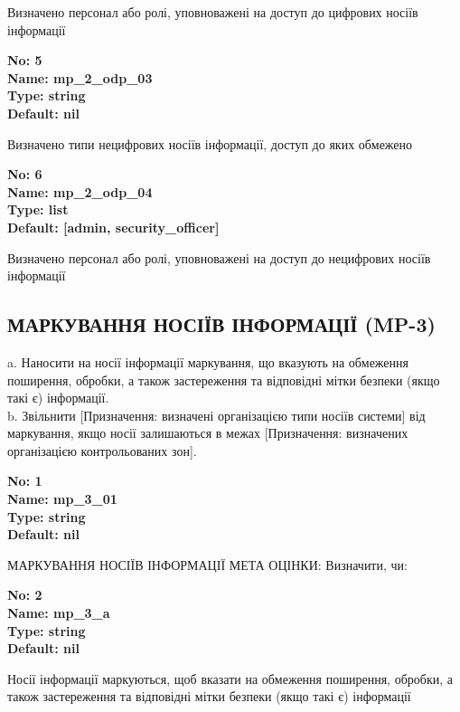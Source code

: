 \documentclass{article}
\begin{document}
{\footnotesize Визначено персонал або ролі, уповноважені на доступ до цифрових носіїв інформації}


{\footnotesize\bfseries
No: 5\\
Name: mp\_\allowbreak{}2\_\allowbreak{}odp\_\allowbreak{}03\\
Type: string\\
Default: nil
}

{\footnotesize Визначено типи нецифрових носіїв інформації, доступ до яких обмежено}


{\footnotesize\bfseries
No: 6\\
Name: mp\_\allowbreak{}2\_\allowbreak{}odp\_\allowbreak{}04\\
Type: list\\
Default: [\textquotedbl{}admin\textquotedbl{}, \textquotedbl{}security\_\allowbreak{}officer\textquotedbl{}]
}

{\footnotesize Визначено персонал або ролі, уповноважені на доступ до нецифрових носіїв інформації}




\subsection{МАРКУВАННЯ НОСІЇВ ІНФОРМАЦІЇ (MP-3)}
a. Наносити на носії інформації маркування, що вказують на обмеження поширення, обробки, а також застереження та відповідні мітки безпеки (якщо такі є) інформації.\\ 
b. Звільнити [Призначення: визначені організацією типи носіїв системи] від маркування, якщо носії залишаються в межах [Призначення: визначених організацією контрольованих зон].

\vspace{10pt}
{\footnotesize\bfseries
No: 1\\
Name: mp\_\allowbreak{}3\_\allowbreak{}01\\
Type: string\\
Default: nil
}

{\footnotesize МАРКУВАННЯ НОСІЇВ ІНФОРМАЦІЇ МЕТА ОЦІНКИ: Визначити, чи:}


{\footnotesize\bfseries
No: 2\\
Name: mp\_\allowbreak{}3\_\allowbreak{}a\\
Type: string\\
Default: nil
}

{\footnotesize Носії інформації маркуються, щоб вказати на обмеження поширення, обробки, а також застереження та відповідні мітки безпеки (якщо такі є) інформації}
\end{document}
